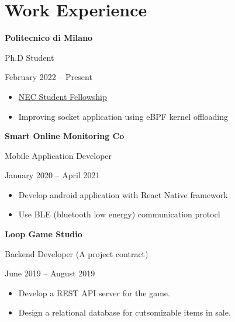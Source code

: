 \section {Work Experience}
\noindent \textbf{Politecnico di Milano} \par
Ph.D Student \par
February 2022 – Present \par
\begin{itemize}
    \item \href{https://neclab.eu/careers/nec-student-research-fellowship-program#fellow-1642}{NEC Student Fellowship}
    \item Improving socket application using eBPF kernel offloading
\end{itemize}
\vspace{15pt}

\noindent \textbf{Smart Online Monitoring Co} \par
Mobile Application Developer \par
January 2020 – April 2021 \par
\begin{itemize}
    \item Develop android application with React Native framework
    \item Use BLE (bluetooth low energy) communication protocl
\end{itemize}
\vspace{15pt}


\noindent \textbf{Loop Game Studio} \par
Backend Developer (A project contract) \par
June 2019 – August 2019 \par
\begin{itemize}
    \item Develop a REST API server for the game.
    \item Design a relational database for cutsomizable items in sale.
\end{itemize}
\vspace{15pt}

